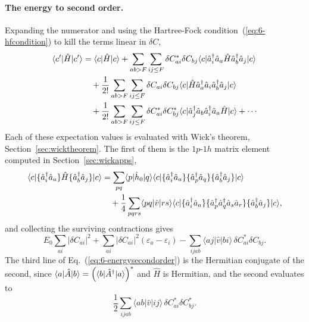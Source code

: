 \paragraph{The energy to second order.}
Expanding the numerator and using the Hartree-Fock
condition~(\ref{eq:6-hfcondition}) to kill the terms linear in $\delta C$,
\begin{align}
  \langle c' | \hat{H} | c' \rangle
  &= \langle c | \hat{H} | c \rangle
   + \sum_{ab>F}\sum_{ij\le F}\delta C^{*}_{ai}\delta C_{bj}
     \langle c | \hat{a}^{\dagger}_{i}\hat{a}_{a}\hat{H}
       \hat{a}^{\dagger}_{b}\hat{a}_{j} | c \rangle
   \nonumber\\
  &\quad
   + \frac{1}{2!}\sum_{ab>F}\sum_{ij\le F}\delta C_{ai}\delta C_{bj}
     \langle c | \hat{H}\hat{a}^{\dagger}_{a}\hat{a}_{i}
       \hat{a}^{\dagger}_{b}\hat{a}_{j} | c \rangle
   \nonumber\\
  &\quad
   + \frac{1}{2!}\sum_{ab>F}\sum_{ij\le F}\delta C^{*}_{ai}\delta C^{*}_{bj}
     \langle c | \hat{a}^{\dagger}_{j}\hat{a}_{b}\hat{a}^{\dagger}_{i}
       \hat{a}_{a}\hat{H} | c \rangle
   + \cdots
  \label{eq:6-energysecondorder}
\end{align}
Each of these expectation values is evaluated with Wick's theorem,
Section~\ref{sec:wicktheorem}.  The first of them is the $1p$-$1h$ matrix
element computed in Section~\ref{sec:wickapps},
\begin{align}
  \langle c | \{\hat{a}^{\dagger}_{i}\hat{a}_{a}\}\hat{H}
    \{\hat{a}^{\dagger}_{b}\hat{a}_{j}\} | c \rangle
  &= \sum_{pq}\langle p | \hat{h}_0 | q \rangle
     \langle c | \{\hat{a}^{\dagger}_{i}\hat{a}_{a}\}
       \{\hat{a}^{\dagger}_{p}\hat{a}_{q}\}
       \{\hat{a}^{\dagger}_{b}\hat{a}_{j}\} | c \rangle
   \nonumber\\
  &\quad + \frac{1}{4}\sum_{pqrs}\langle pq\vert\hat{v}\vert rs\rangle
     \langle c | \{\hat{a}^{\dagger}_{i}\hat{a}_{a}\}
       \{\hat{a}^{\dagger}_{p}\hat{a}^{\dagger}_{q}\hat{a}_{s}\hat{a}_{r}\}
       \{\hat{a}^{\dagger}_{b}\hat{a}_{j}\} | c \rangle,
  \label{eq:6-onephonemat}
\end{align}
and collecting the surviving contractions gives
\begin{equation}
  E_0\sum_{ai}\vert\delta C_{ai}\vert^2
  + \sum_{ai}\vert\delta C_{ai}\vert^2
    \left(\varepsilon_a-\varepsilon_i\right)
  - \sum_{ijab}\langle aj\vert\hat{v}\vert bi\rangle
    \,\delta C^{*}_{ai}\delta C_{bj}.
  \label{eq:6-firstblock}
\end{equation}
The third line of Eq.~(\ref{eq:6-energysecondorder}) is the Hermitian
conjugate of the second, since
$\langle a | \hat{A} | b \rangle=\left(\langle b | \hat{A}^{\dagger} | a \rangle\right)^{*}$
and $\hat{H}$ is Hermitian, and the second evaluates to
\begin{equation}
  \frac{1}{2}\sum_{ijab}\langle ab\vert\hat{v}\vert ij\rangle
    \,\delta C^{*}_{ai}\delta C^{*}_{bj} .
  \label{eq:6-secondblock}
\end{equation}

